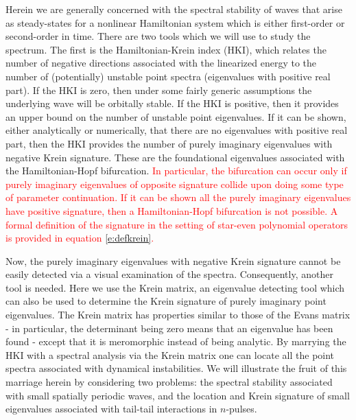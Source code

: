 \documentclass[review,onefignum,onetabnum]{siamart171218}
\newcommand{\revised}[1]{ \textcolor{red}{#1} }
\begin{document}
Herein we are generally concerned with the spectral stability of waves that arise as steady-states for a nonlinear Hamiltonian system which is either first-order or second-order in time.  There are two tools which we will use to study the spectrum. The first is the Hamiltonian-Krein index (HKI), which relates the number of negative directions associated with the linearized energy to the number of (potentially) unstable point spectra (eigenvalues with positive real part).  If the HKI is zero, then under some fairly generic assumptions the underlying wave will be orbitally stable. If the HKI is positive, then it provides an upper bound on the number of unstable point eigenvalues. If it can be shown, either analytically or numerically, that there are no eigenvalues with positive real part, then the HKI provides the number of purely imaginary eigenvalues with negative Krein signature. These are the foundational eigenvalues associated with the Hamiltonian-Hopf bifurcation.
\revised{In particular, the bifurcation can occur only if purely imaginary eigenvalues of opposite signature collide upon doing some type of parameter continuation. If it can be shown all the purely imaginary eigenvalues have positive signature, then a Hamiltonian-Hopf bifurcation is not possible. A formal definition of the signature in the setting of star-even polynomial operators is provided in equation \cref{e:defkrein}.}

Now, the purely imaginary eigenvalues with negative Krein signature cannot be easily detected via a visual examination of the spectra. Consequently, another tool is needed.
Here we use the Krein matrix, an eigenvalue detecting tool which can also be used to determine the Krein signature of purely imaginary point eigenvalues. The Krein matrix has properties similar to those of the Evans matrix - in particular, the determinant being zero means that an eigenvalue has been found - except that it is meromorphic instead of being analytic.  By marrying the HKI with a spectral analysis via the Krein matrix one can locate all the point spectra associated with dynamical instabilities. We will illustrate the fruit of this marriage herein by considering two problems: the spectral stability associated with small spatially periodic waves, and the location and Krein signature of small eigenvalues associated with tail-tail interactions in $n$-pulses.
\end{document}
